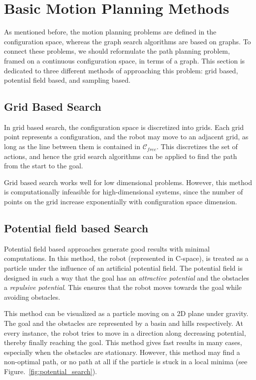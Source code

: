 \section{Basic Motion Planning Methods}
\label{sec:basic_motion_planning}
As mentioned before, the motion planning problems are defined in the configuration space, whereas the graph search algorithms are based on graphs. To connect these problems, we should reformulate the path planning problem, framed on a continuous configuration space, in terms of a graph. This section is dedicated to three different methods of approaching this problem: grid based, potential field based, and sampling based.
\subsection{Grid Based Search}
\label{sec:grid_search}
In grid based search, the configuration space is discretized into grids. Each grid point represents a configuration, and the robot may move to an adjacent grid, as long as the line between them is contained in $\mathcal{C}_{free}$. This discretizes the set of actions, and hence the grid search algorithms can be applied to find the path from the start to the goal. 

Grid based search works well for low dimensional problems. However, this method is computationally infeasible for high-dimensional systems, since the number of points on the grid increase exponentially with configuration space dimension. 
\subsection{Potential field based Search}
\label{sec:pot_search}
Potential field based approaches generate good results with minimal computations. In this method, the robot (represented in C-space), is treated as a particle under the influence of an artificial potential field. The potential field is designed in such a way that the goal has an \textit{attractive potential} and the obstacles a \textit{repulsive potential}. This ensures that the robot moves towards the goal while avoiding obstacles. 

This method can be visualized as a particle moving on a 2D plane under gravity. The goal and the obstacles are represented by a basin and hills respectively. At every instance, the robot tries to move in a direction along decreasing potential, thereby finally reaching the goal. This method gives fast results in many cases, especially when the obstacles are stationary. However, this method may find a non-optimal path, or no path at all if the particle is stuck in a local minima (see Figure.~\ref{fig:potential_search}).

